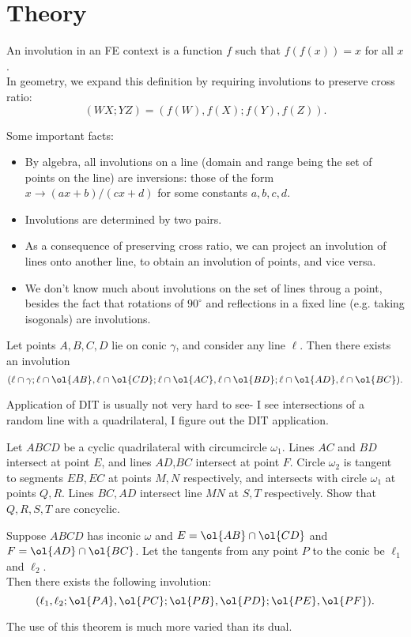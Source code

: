 \documentclass{seto}
\begin{document}
\section{Theory}
\begin{thm}
    An involution in an FE context is a function
    $f$ such that $f(f(x))=x$ for all $x$. \\
    In geometry, we expand this definition by requiring involutions to preserve
    cross ratio: 
    \[(WX;YZ)=(f(W),f(X);f(Y),f(Z)).\]
\end{thm}
Some important facts:
\begin{itemize}
\item By algebra, all involutions on a line (domain and range being the set of points on the line) are 
inversions: those of the form $x\to (ax+b)/(cx+d)$ for some constants $a,b,c,d$.
\item Involutions are determined by two pairs.
\item As a consequence of preserving cross ratio, we can project an involution 
of lines onto another line, to obtain an involution of points, and vice versa.
\item We don't know much about involutions on the set of lines throug a point, besides
the fact that rotations of $90^\circ$ and reflections in a fixed line (e.g. taking isogonals)
are involutions.
\end{itemize}
\begin{thm}
Let points $A,B,C,D$ lie on conic $\gamma$, and consider any line $\ell$.
Then there exists an involution
\[(\ell\cap\gamma;\ell\cap\ol{AB},\ell\cap\ol{CD};
\ell\cap\ol{AC},\ell\cap\ol{BD}; \ell\cap\ol{AD},\ell\cap\ol{BC}).\]
\end{thm}
Application of DIT is usually not very hard to see- I see intersections of a random
line with a quadrilateral, I figure out the DIT application.
\begin{block}
Let $ABCD$ be a cyclic quadrilateral with circumcircle $\omega_1$. Lines $AC$
and $BD$ intersect at point $E$, and lines $AD$,$BC$ intersect at point
$F$. Circle $\omega_2$ is tangent to segments $EB,EC$ at points $M,N$
respectively, and intersects with circle $\omega_1$ at points $Q,R$. Lines $BC,AD$
intersect line $MN$ at $S,T$ respectively. Show that $Q,R,S,T$ are concyclic.
\end{block}
\begin{thm}
Suppose $ABCD$ has inconic $\omega$ and $E=\ol{AB}\cap\ol{CD}$ and $F=\ol{AD}\cap\ol{BC}$.
Let the tangents from any point $P$ to the conic be $\ell_1$ and $\ell_2$.\\
Then there exists the following involution:
\[(\ell_1,\ell_2;\ol{PA},\ol{PC};\ol{PB},\ol{PD};\ol{PE},\ol{PF}).\]
\end{thm}
The use of this theorem is much more varied than its dual. 
\end{document}
